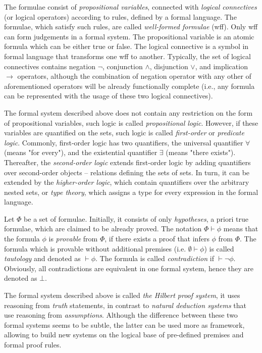 \documentclass[article]{aaltoseries}
\begin{document}
The formulae consist of \textit{propositional variables}, connected with \textit{logical connectives} (or logical operators) according to rules, defined by a formal language. The formulae, which satisfy such rules, are called \textit{well-formed formulae} (wff). Only wff can form judgements in a formal system. The propositional variable is an atomic formula which can be either true or false. The logical connective is a symbol in formal language that transforms one wff to another. Typically, the set of logical connectives contains negation $\neg$, conjunction $\land$, disjunction $\lor$, and implication $\rightarrow$ operators, although the combination of negation operator with any other of aforementioned operators will be already functionally complete (i.e., any formula can be represented with the usage of these two logical connectives).

The formal system described above does not contain any restriction on the form of propositional variables, such logic is called \textit{propositional logic}. However, if these variables are quantified on the sets, such logic is called \textit{first-order} or \textit{predicate logic}. Commonly, first-order logic has two quantifiers, the universal quantifier $\forall$ (means "for every"), and the existential quantifier $\exists$ (means "there exists"). Thereafter, the \textit{second-order logic} extends first-order logic by adding quantifiers over second-order objects -- relations defining the sets of sets. In turn, it can be extended by the \textit{higher-order logic}, which contain quantifiers over the arbitrary nested sets, or \textit{type theory}, which assigns a type for every expression in the formal language.

Let $\Phi$ be a set of formulae. Initially, it consists of only \textit{hypotheses}, a priori true formulae, which are claimed to be already proved. The notation $\Phi \vdash \phi$ means that the formula $\phi$ is \textit{provable} from $\Phi$, if there exists a proof that infers $\phi$ from $\Phi$. The formula which is provable without additional premises (i.e. $\emptyset \vdash \phi$) is called \textit{tautology} and denoted as $ \vdash \phi $. The formula is called \textit{contradiction} if $\vdash \neg \phi$. Obviously, all contradictions are equivalent in one formal system, hence they are denoted as $\bot$.

The formal system described above is called \textit{the Hilbert proof system}, it uses reasoning from \textit{truth} statements, in contrast to \textit{natural deduction systems} that use reasoning from \textit{assumptions}. Although the difference between these two formal systems seems to be subtle, the latter can be used more as framework, allowing to build new systems on the logical base of pre-defined premises and formal proof rules. %
\end{document}
